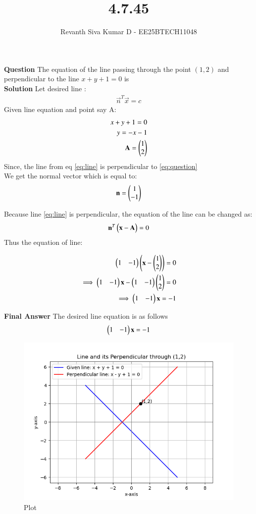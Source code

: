 \documentclass[journal]{IEEEtran}
\begin{document}


\title{4.7.45}
\author{Revanth Siva Kumar D - EE25BTECH11048
}
{\let\newpage\relax\maketitle}

\textbf{Question} The equation of the line passing through the point $(1, 2)$ and perpendicular to the line $x + y + 1 = 0$ is\\
\textbf{Solution}
Let desired line :
\begin{align}
    \vec{n}^T\vec{x}=c
    \label{eq:question}
\end{align}
Given line equation and point say A:
\begin{align}
    x+y+1=0
    \label{eq:line}\\
    y=-x-1\\
    \mathbf{A}=\begin{pmatrix}1\\2\end{pmatrix}
\end{align}
Since, the line from eq \eqref{eq:line} is perpendicular to \eqref{eq:question} \\
We get the normal vector which is equal to:
\begin{align}
   \mathbf{n} =\begin{pmatrix}1\\-1\end{pmatrix}
\end{align}

Because line \eqref{eq:line} is perpendicular, the equation of the line can be changed as:
\begin{align}
    \mathbf{n}^T\begin{pmatrix}\mathbf{x} - \mathbf{A}\end{pmatrix}=0
\end{align}
Thus the equation of line:

\begin{align}
    \begin{pmatrix}1&-1\end{pmatrix}\begin{pmatrix}\mathbf{x} - \begin{pmatrix}1\\2\end{pmatrix}\end{pmatrix}=0\\
    \implies  \begin{pmatrix}1&-1\end{pmatrix}\mathbf{x}-\begin{pmatrix}1&-1\end{pmatrix}\begin{pmatrix}1\\2\end{pmatrix}=0\\
    \implies \begin{pmatrix}1&-1\end{pmatrix}\mathbf{x}=-1
\end{align}

\textbf{Final Answer}
The desired line equation is as follows
\begin{align*}
    \begin{pmatrix}1&-1\end{pmatrix}\mathbf{x}=-1
\end{align*}

\begin{figure}
    \centering
    \includegraphics[width=0.8\columnwidth]{figs/Figure_1.png}
    \caption{Plot}
    \label{fig:fig1}
\end{figure}
\end{document}
